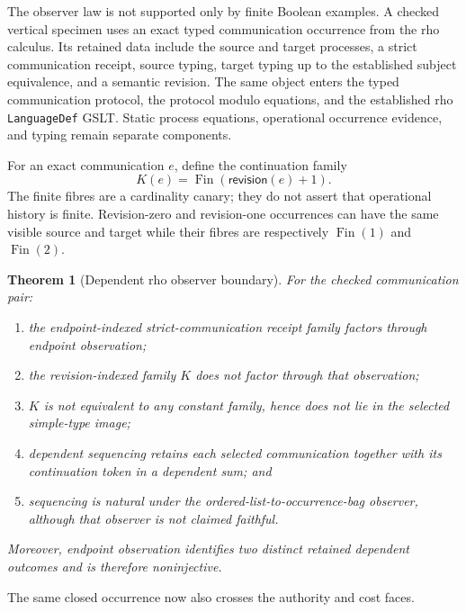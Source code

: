 \documentclass[11pt]{article}
\newtheorem{theorem}{Theorem}
\theoremstyle{definition}
\theoremstyle{remark}
\newcommand{\code}[1]{\texttt{#1}}
\begin{document}
The observer law is not supported only by finite Boolean examples.  A checked
vertical specimen uses an exact typed communication occurrence from the rho
calculus.  Its retained data include the source and target processes, a strict
communication receipt, source typing, target typing up to the established
subject equivalence, and a semantic revision.  The same object enters the typed
communication protocol, the protocol modulo equations, and the established
rho \code{LanguageDef} GSLT.  Static process equations, operational occurrence
evidence, and typing remain separate components.

For an exact communication $e$, define the continuation family
\[
  K(e)=\operatorname{Fin}(\mathsf{revision}(e)+1).
\]
The finite fibres are a cardinality canary; they do not assert that operational
history is finite.  Revision-zero and revision-one occurrences can have the
same visible source and target while their fibres are respectively
$\operatorname{Fin}(1)$ and $\operatorname{Fin}(2)$.

\begin{theorem}[Dependent rho observer boundary]
For the checked communication pair:
\begin{enumerate}[label=(\roman*)]
\item the endpoint-indexed strict-communication receipt family factors through
  endpoint observation;
\item the revision-indexed family $K$ does not factor through that observation;
\item $K$ is not equivalent to any constant family, hence does not lie in the
  selected simple-type image;
\item dependent sequencing retains each selected communication together with
  its continuation token in a dependent sum; and
\item sequencing is natural under the ordered-list-to-occurrence-bag observer,
  although that observer is not claimed faithful.
\end{enumerate}
Moreover, endpoint observation identifies two distinct retained dependent
outcomes and is therefore noninjective.
\end{theorem}

The same closed occurrence now also crosses the authority and cost faces.
\end{document}
